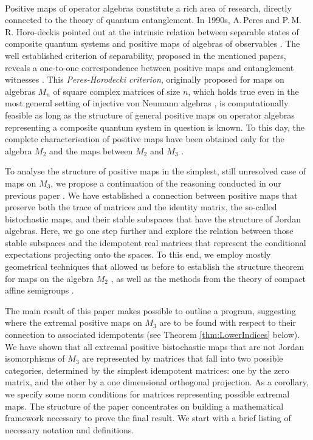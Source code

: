 \documentclass[12pt]{article}
\theoremstyle{plain}
\theoremstyle{definition}
\theoremstyle{remark}
\numberwithin{equation}{section}
\begin{document}
\paragraph{}
Positive maps of operator algebras constitute a rich area of research, directly
connected to the theory of quantum entanglement.
In 1990s,
A.\,Peres and P.\,M.\,R. {Horo-deckis} pointed out at the intrinsic relation
between separable states of composite quantum systems
and positive maps of algebras of observables
\cite{peres1996separability,horodecki1996separability}.
The well established criterion of separability, proposed in the mentioned papers,
reveals a one-to-one correspondence between
positive maps and entanglement witnesses
\cite{chruscinski2014entanglement}.
This \emph{Peres-Horodecki criterion},
originally proposed for maps on algebras $M_{n}$ of square complex matrices of size $n$,
which holds true even in the most general setting of
injective von Neumann algebras \cite{miller2014horodeckis},
is computationally feasible as long as the structure of general positive
maps on operator algebras representing a composite quantum system in 
question is known.
To this day, the complete characterisation 
of positive maps have been obtained only for the algebra $M_{2}$
and the maps between $M_{2}$ and $M_{3}$
\cite{stormer1963positive,woronowicz1976positive}.

To analyse the structure of positive maps in the simplest, still unresolved
case of maps on $M_{3}$,
we propose a continuation of the reasoning conducted in our previous paper
\cite{miller2015stable}.
We have established a connection between positive maps that preserve both
the trace of matrices and the identity matrix, the so-called bistochastic
maps, and their stable subspaces that have the structure of Jordan algebras.
Here, we go one step further and explore the relation between those stable
subspaces and the idempotent real matrices that represent the conditional
expectations projecting onto the spaces.
To this end, we employ mostly geometrical techniques that allowed us before to
establish the structure theorem for maps on the algebra $M_{2}$
\cite{miller2015topology},
as well as the methods from the theory of compact affine semigroups
\cite{schwarz1955hausdorff,chow1975compact}.

The main result of this paper makes possible to outline a program,
suggesting where the extremal positive maps on $M_{3}$ are to be found
with respect to their connection to associated idempotents
(see Theorem \ref{thm:LowerIndices} below).
We have shown that all extremal positive bistochastic maps that are not
Jordan isomorphisms of $M_3$ are represented by matrices that fall into two possible
categories, determined by the simplest idempotent matrices:
one by the zero matrix, and the other by a one dimensional orthogonal projection.
As a corollary, we specify some norm conditions for matrices representing possible
extremal maps.
The structure of the paper concentrates on building a mathematical framework
necessary to prove the final result.
We start with a brief listing of necessary notation and definitions.
\end{document}
